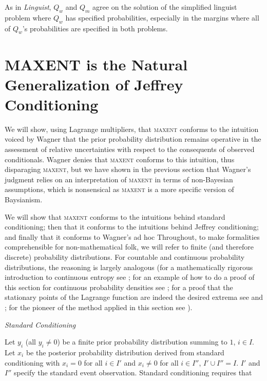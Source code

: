 \documentclass[11pt]{article}
\begin{document}
\medskip

As in \emph{Linguist}, $Q_{w}$ and $Q_{m}$ agree on the solution of
the simplified linguist problem where $Q_{w}$ has specified
probabilities, especially in the margins where all of $Q_{w}$'s
probabilities are specified in both problems.

\section{MAXENT is the Natural Generalization of Jeffrey Conditioning}
\label{maxjeff}

We will show, using Lagrange multipliers, that \textsc{maxent}
conforms to the intuition voiced by Wagner that the prior probability
distribution remains operative in the assessment of relative
uncertainties with respect to the consequents of observed
conditionals. Wagner denies that \textsc{maxent} conforms to this
intuition, thus disparaging \textsc{maxent}, but we have shown in the
previous section that Wagner's judgment relies on an interpretation of
\textsc{maxent} in terms of non-Bayesian assumptions, which is
nonsensical as \textsc{maxent} is a more specific version of
Baysianism.

We will show that \textsc{maxent} conforms to the intuitions behind
standard conditioning; then that it conforms to the intuitions behind
Jeffrey conditioning; and finally that it conforms to Wagner's ad hoc
 Throughout, to
make formalities comprehensible for non-mathematical folk, we will
refer to finite (and therefore discrete) probability distributions.
For countable and continuous probability distributions, the reasoning
is largely analogous (for a mathematically rigorous introduction to
continuous entropy see ; for an example of
how to do a proof of this section for continuous probability densities
see ; for a proof that the stationary
points of the Lagrange function are indeed the desired extrema see
 and ; for the
pioneer of the method applied in this section see
).

\medskip

{\noindent}\emph{Standard Conditioning}

\medskip

{\noindent}Let $y_{i}$ (all $y_{i}\neq{}0$) be a finite prior
probability distribution summing to $1$, $i\in{}I$. Let $x_{i}$ be the
posterior probability distribution derived from standard conditioning
with $x_{i}=0$ for all $i\in{}I'$ and $x_{i}\neq{}0$ for all
$i\in{}I''$, $I'\cup{}I''=I$. $I'$ and $I''$ specify the standard
event observation. Standard conditioning requires that
\end{document}
